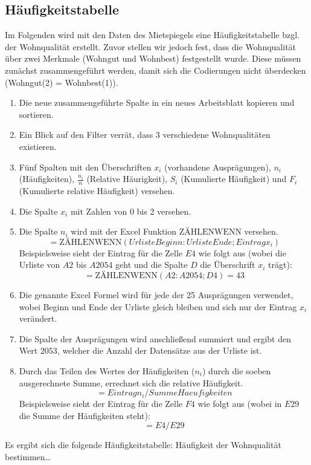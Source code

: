 \subsection{Häufigkeitstabelle}
Im Folgenden wird mit den Daten des Mietspiegels eine Häufigkeitstabelle bzgl. der Wohnqualität
erstellt. Zuvor stellen wir jedoch fest, dass die Wohnqualität über zwei Merkmale (Wohngut und
Wohnbest) festgestellt wurde. Diese müssen zunächst zusammengeführt werden, damit sich die Codierungen nicht
überdecken (Wohngut(2) = Wohnbest(1)). 

\begin{enumerate}
  \item Die neue zusammengeführte Spalte  in ein neues Arbeitsblatt kopieren und
  sortieren.
  \item Ein Blick auf den Filter verrät, dass 3 verschiedene Wohnqualitäten existieren.
  \item Fünf Spalten mit den Überschriften $x_i$ (vorhandene Ausprägungen), $n_i$
  (Häufigkeiten), $\frac{n_i}{n}$ (Relative Häurigkeit), $S_i$ (Kumulierte Häufigkeit) und $F_i$
  (Kumulierte relative Häufigkeit) versehen.
  \item Die Spalte $x_i$ mit Zahlen von 0 bis 2 versehen.
  \item Die Spalte $n_i$ wird mit der Excel Funktion $\text{ZÄHLENWENN}$ versehen.
  \[=\text{ZÄHLENWENN}(UrlisteBeginn:UrlisteEnde;Eintrag x_i)\] Beispielsweise sieht der
  Eintrag für die Zelle $E4$ wie folgt aus (wobei die Urliste von $A2$ bis $A2054$ geht und
  die Spalte $D$ die Überschrift $x_i$ trägt): \[=\text{ZÄHLENWENN}(A2:A2054;D4)=43\]
  \item Die genannte Excel Formel wird für jede der 25 Ausprägungen verwendet, wobei Beginn und Ende
  der Urliste gleich bleiben und sich nur der Eintrag $x_i$ verändert.
  \item Die Spalte der Ausprägungen wird anschließend summiert und ergibt den Wert $2053$, welcher
  die Anzahl der Datensätze aus der Urliste ist.
  \item Durch das Teilen des Wertes der Häufigkeiten ($n_i$) durch die soeben
  ausgerechnete Summe, errechnet sich die relative Häufigkeit. \[=Eintrag n_i/SummeHaeufigkeiten\]
  Beispielsweise sieht der Eintrag für die Zelle $F4$ wie folgt aus (wobei in $E29$ die Summe der
  Häufigkeiten steht): \[=E4/E29\]
\end{enumerate} 

\newpage
Es ergibt sich die folgende Häufigkeitstabelle:
Häufigkeit der Wohnqualität bestimmen\ldots

